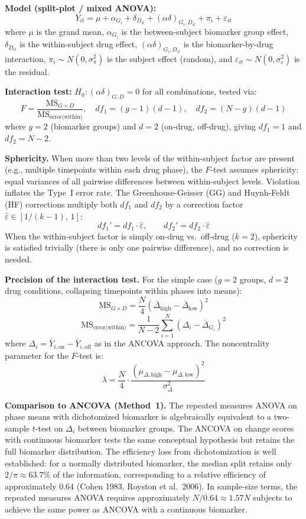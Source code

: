 \documentclass[11pt,letterpaper]{article}
\begin{document}
\textbf{Model (split-plot / mixed ANOVA):}
\[
Y_{it} = \mu + \alpha_{G_i} + \delta_{D_{it}} +
(\alpha\delta)_{G_i, D_{it}} + \pi_i + \varepsilon_{it}
\]
where $\mu$ is the grand mean, $\alpha_{G_i}$ is the between-subject
biomarker group effect, $\delta_{D_{it}}$ is the within-subject drug
effect, $(\alpha\delta)_{G_i, D_{it}}$ is the biomarker-by-drug
interaction, $\pi_i \sim N(0, \sigma^2_\pi)$ is the subject effect
(random), and $\varepsilon_{it} \sim N(0, \sigma^2_\varepsilon)$ is the
residual.

\textbf{Interaction test:} $H_0: (\alpha\delta)_{G,D} = 0$ for all
combinations, tested via:
\[
F = \frac{\text{MS}_{G \times D}}{\text{MS}_{\text{error(within)}}},
\quad df_1 = (g-1)(d-1), \quad df_2 = (N-g)(d-1)
\]
where $g = 2$ (biomarker groups) and $d = 2$ (on-drug, off-drug), giving
$df_1 = 1$ and $df_2 = N - 2$.

\textbf{Sphericity.} When more than two levels of the within-subject
factor are present (e.g., multiple timepoints within each drug phase),
the $F$-test assumes sphericity: equal variances of all pairwise
differences between within-subject levels. Violation inflates the
Type~I error rate. The Greenhouse-Geisser (GG) and Huynh-Feldt (HF)
corrections multiply both $df_1$ and $df_2$ by a correction factor
$\hat{\varepsilon} \in [1/(k-1),\, 1]$:
\[
df_1' = df_1 \cdot \hat{\varepsilon}, \qquad
df_2' = df_2 \cdot \hat{\varepsilon}
\]
When the within-subject factor is simply on-drug vs.\ off-drug
($k = 2$), sphericity is satisfied trivially (there is only one
pairwise difference), and no correction is needed.

\textbf{Precision of the interaction test.} For the simple case
($g = 2$ groups, $d = 2$ drug conditions, collapsing timepoints within
phases into means):
\[
\text{MS}_{G \times D} =
\frac{N}{4} \left(
\bar{\Delta}_{\text{high}} - \bar{\Delta}_{\text{low}}
\right)^2
\]
\[
\text{MS}_{\text{error(within)}} =
\frac{1}{N-2} \sum_{i=1}^{N}
(\Delta_i - \bar{\Delta}_{G_i})^2
\]
where $\Delta_i = \bar{Y}_{i,\text{on}} - \bar{Y}_{i,\text{off}}$ as
in the ANCOVA approach. The noncentrality parameter for the $F$-test is:
\[
\lambda = \frac{N}{4} \cdot
\frac{(\mu_{\Delta,\text{high}} -
\mu_{\Delta,\text{low}})^2}{\sigma^2_\Delta}
\]

\textbf{Comparison to ANCOVA (Method~1).} The repeated measures ANOVA
on phase means with dichotomized biomarker is algebraically equivalent
to a two-sample $t$-test on $\Delta_i$ between biomarker groups. The
ANCOVA on change scores with continuous biomarker tests the same
conceptual hypothesis but retains the full biomarker distribution. The
efficiency loss from dichotomization is well established: for a normally
distributed biomarker, the median split retains only
$2/\pi \approx 63.7\%$ of the information, corresponding to a relative
efficiency of approximately 0.64 (Cohen 1983, Royston et al.\ 2006). In
sample-size terms, the repeated measures ANOVA requires approximately
$N/0.64 \approx 1.57N$ subjects to achieve the same power as ANCOVA
with a continuous biomarker.
\end{document}
